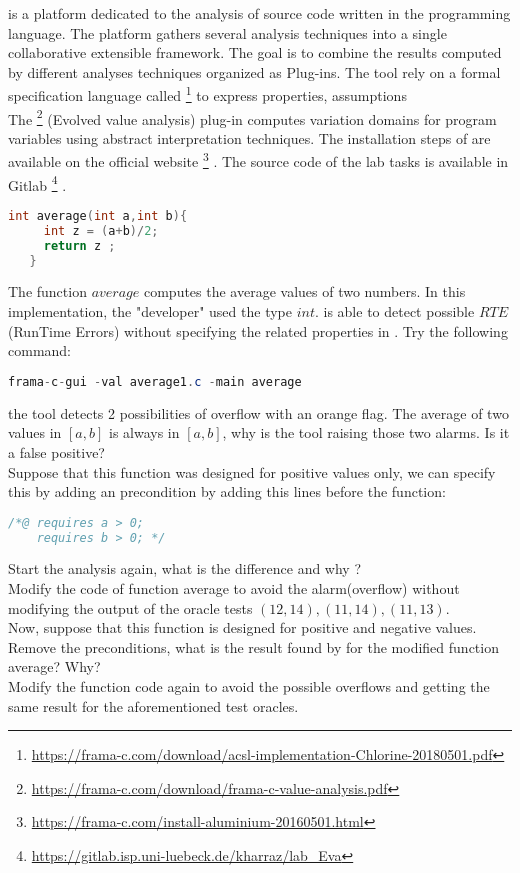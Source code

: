 \documentclass[language=en,sheet=3,prefix]{exercise}
\begin{document}
\framac is a platform dedicated to the analysis of source code written in
the \C programming language. The \framac platform gathers several analysis techniques into a single collaborative extensible framework. The goal is to combine the results computed by different analyses techniques organized as Plug-ins. The tool rely on a formal specification language called \acsl \footnote{\url{https://frama-c.com/download/acsl-implementation-Chlorine-20180501.pdf}} to express properties, assumptions \etc  \\ The \eva \footnote{\url{https://frama-c.com/download/frama-c-value-analysis.pdf}} (Evolved value analysis) plug-in computes variation domains for program variables using abstract interpretation techniques. The installation steps of \framac are available on the official website \footnote{\url{https://frama-c.com/install-aluminium-20160501.html}} . The source code of the lab tasks is available in Gitlab \footnote{\url{https://gitlab.isp.uni-luebeck.de/kharraz/lab_Eva}} .

\begin{lstlisting}[language=c,gobble=2]
   int average(int a,int b){
     int z = (a+b)/2;
     return z ;
   }
\end{lstlisting}
The function $average$ computes the average values of two numbers. In this implementation, the "developer" used the type $int$. 
\eva is able to detect possible $RTE$ (RunTime Errors)  without specifying the related properties in \acsl. Try the following command:

\begin{lstlisting}[language=Java]
 frama-c-gui -val average1.c -main average
\end{lstlisting}

the tool detects 2 possibilities of overflow with an orange flag. The average of two values in $[a,b]$ is always in $[a,b]$, why is the tool raising those two alarms. Is it a false positive?\\

Suppose that this function was designed for positive values only, we can specify this  by adding an \acsl precondition by adding this lines before the function: 
\begin{lstlisting}[language=c]
/*@ requires a > 0;
    requires b > 0; */ 
\end{lstlisting}

Start the analysis again, what is the difference and why ?\\
Modify the code of function average to avoid the alarm(overflow) without modifying the output of the oracle tests $(12,14), (11,14), (11,13)$.\\
Now, suppose that this function is designed for positive and negative values. Remove the preconditions, what is the result found by \eva for the modified function average? Why?\\
Modify the function code again to avoid the possible overflows and getting the same result for the aforementioned test oracles.
\\
\end{document}
